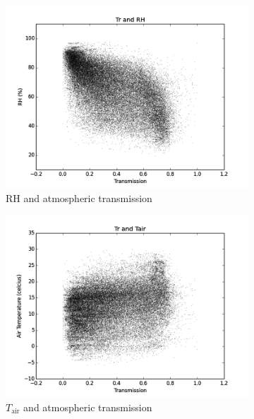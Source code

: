 \documentclass[a4paper,titlepage, twoside]{report}
\begin{document}
\begin{figure}
\centering
\begin{subfigure}{0.48\textwidth}
\includegraphics[width=\textwidth]{021_Tr_RH.png}
\caption{RH and atmospheric transmission}
\end{subfigure}
\hfill
\begin{subfigure}{0.48\textwidth}
\includegraphics[width=\textwidth]{022_Tr_Tair.png}
\caption{$T_\mathrm{air}$ and atmospheric transmission}
\end{subfigure}
\\
\begin{subfigure}{0.48\textwidth}

\end{subfigure}
\end{figure}
\end{document}
